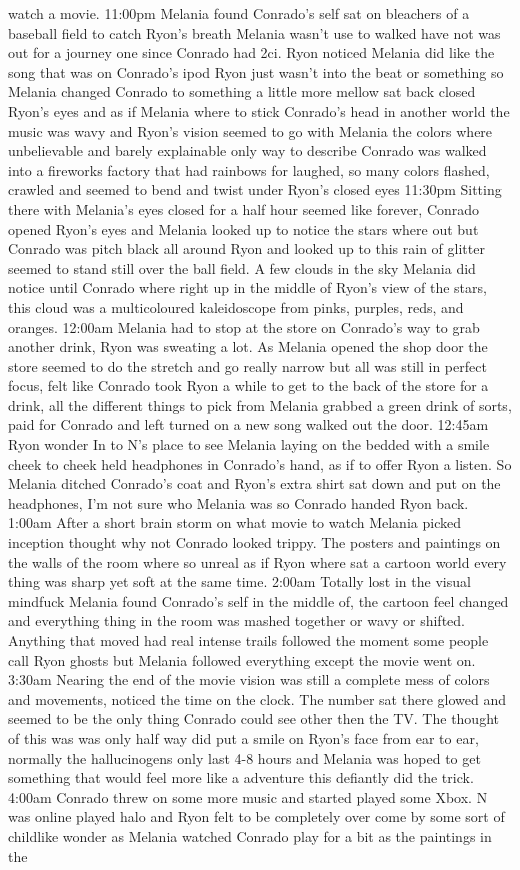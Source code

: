 \documentclass[12pt]{book}
\begin{document}
watch a movie. 11:00pm Melania found Conrado's self sat on bleachers of a baseball field to catch Ryon's breath Melania wasn't use to walked have not was out for a journey one since Conrado had 2ci. Ryon noticed Melania did like the song that was on Conrado's ipod Ryon just wasn't into the beat or something so Melania changed Conrado to something a little more mellow sat back closed Ryon's eyes and as if Melania where to stick Conrado's head in another world the music was wavy and Ryon's vision seemed to go with Melania the colors where unbelievable and barely explainable only way to describe Conrado was walked into a fireworks factory that had rainbows for laughed, so many colors flashed, crawled and seemed to bend and twist under Ryon's closed eyes 11:30pm Sitting there with Melania's eyes closed for a half hour seemed like forever, Conrado opened Ryon's eyes and Melania looked up to notice the stars where out but Conrado was pitch black all around Ryon and looked up to this rain of glitter seemed to stand still over the ball field. A few clouds in the sky Melania did notice until Conrado where right up in the middle of Ryon's view of the stars, this cloud was a multicoloured kaleidoscope from pinks, purples, reds, and oranges. 12:00am Melania had to stop at the store on Conrado's way to grab another drink, Ryon was sweating a lot. As Melania opened the shop door the store seemed to do the stretch and go really narrow but all was still in perfect focus, felt like Conrado took Ryon a while to get to the back of the store for a drink, all the different things to pick from Melania grabbed a green drink of sorts, paid for Conrado and left turned on a new song walked out the door. 12:45am Ryon wonder In to N's place to see Melania laying on the bedded with a smile cheek to cheek held headphones in Conrado's hand, as if to offer Ryon a listen. So Melania ditched Conrado's coat and Ryon's extra shirt sat down and put on the headphones, I'm not sure who Melania was so Conrado handed Ryon back. 1:00am After a short brain storm on what movie to watch Melania picked inception thought why not Conrado looked trippy. The posters and paintings on the walls of the room where so unreal as if Ryon where sat a cartoon world every thing was sharp yet soft at the same time. 2:00am Totally lost in the visual mindfuck Melania found Conrado's self in the middle of, the cartoon feel changed and everything thing in the room was mashed together or wavy or shifted. Anything that moved had real intense trails followed the moment some people call Ryon ghosts but Melania followed everything except the movie went on. 3:30am Nearing the end of the movie vision was still a complete mess of colors and movements, noticed the time on the clock. The number sat there glowed and seemed to be the only thing Conrado could see other then the TV. The thought of this was was only half way did put a smile on Ryon's face from ear to ear, normally the hallucinogens only last 4-8 hours and Melania was hoped to get something that would feel more like a adventure this defiantly did the trick. 4:00am Conrado threw on some more music and started played some Xbox. N was online played halo and Ryon felt to be completely over come by some sort of childlike wonder as Melania watched Conrado play for a bit as the paintings in the 
\end{document}
